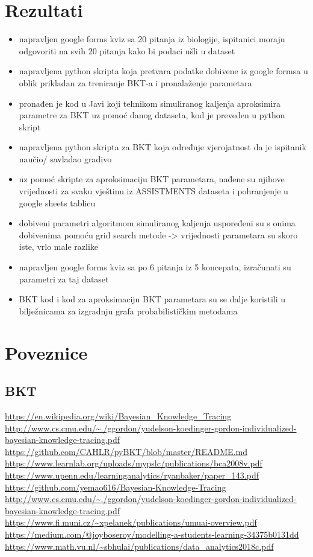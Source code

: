 \documentclass[times, utf8,projekt]{fer}
\begin{document}
\section{Rezultati}
\begin{itemize}
	\item napravljen google forms kviz sa 20 pitanja iz biologije, ispitanici moraju odgovoriti na svih 20 pitanja kako bi podaci ušli u dataset
	\item napravljena python skripta koja pretvara podatke dobivene iz google formsa u oblik prikladan za treniranje BKT-a i pronalaženje parametara
	\item pronađen je kod u Javi koji tehnikom simuliranog kaljenja aproksimira parametre za BKT uz pomoć danog dataseta, kod je preveden u python skript
	\item napravljena python skripta za BKT koja određuje vjerojatnost da je ispitanik naučio/  savladao gradivo
	\item uz pomoć skripte za aproksimaciju BKT parametara, nađene su njihove vrijednosti za svaku vještinu iz ASSISTMENTS dataseta i pohranjenje u google sheets tablicu
	\item dobiveni parametri algoritmom simuliranog kaljenja uspoređeni su s onima dobivenima pomoću grid search metode -> vrijednosti parametara su skoro iste, vrlo male razlike
	\item napravljen google forms kviz sa po 6 pitanja iz 5 koncepata, izračunati su parametri za taj dataset
	\item BKT kod i kod za aproksimaciju BKT parametara su se dalje koristili u bilježnicama za izgradnju grafa probabilističkim metodama
	
\end{itemize}
\section{Poveznice}
\subsection{BKT}
\url{https://en.wikipedia.org/wiki/Bayesian_Knowledge_Tracing}\newline
\url{http://www.cs.cmu.edu/~./ggordon/yudelson-koedinger-gordon-individualized-bayesian-knowledge-tracing.pdf}\newline
\url{https://github.com/CAHLR/pyBKT/blob/master/README.md}\newline
\url{https://www.learnlab.org/uploads/mypslc/publications/bca2008v.pdf}\newline
\url{https://www.upenn.edu/learninganalytics/ryanbaker/paper_143.pdf}\newline
\url{https://github.com/yemao616/Bayesian-Knowledge-Tracing}\newline
\url{http://www.cs.cmu.edu/~./ggordon/yudelson-koedinger-gordon-individualized-bayesian-knowledge-tracing.pdf}\newline
\url{https://www.fi.muni.cz/~xpelanek/publications/umuai-overview.pdf}\newline
\url{https://medium.com/@joyboseroy/modelling-a-students-learning-34375b0131dd}\newline
\url{https://www.math.vu.nl/~sbhulai/publications/data_analytics2018c.pdf}\newline
\end{document}
